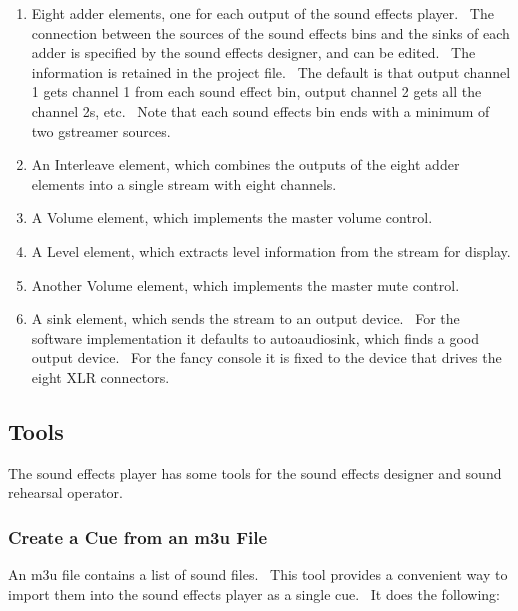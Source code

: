 \documentclass[letterpaper]{article}
\newcommand\liststyleLxix{%
\renewcommand\theenumi{\arabic{enumi}}
\renewcommand\theenumii{\arabic{enumii}}
\renewcommand\theenumiii{\arabic{enumiii}}
\renewcommand\theenumiv{\arabic{enumiv}}
\renewcommand\labelenumi{\theenumi.}
\renewcommand\labelenumii{\theenumii.}
\renewcommand\labelenumiii{\theenumiii.}
\renewcommand\labelenumiv{\theenumiv.}
}
\begin{document}
\liststyleLxix
\begin{enumerate}
\item Eight adder elements, one for each output of the sound effects
player. \ The connection between the sources of the sound effects bins
and the sinks of each adder is specified by the sound effects designer,
and can be edited. \ The information is retained in the project file.
\ The default is that output channel 1 gets channel 1 from each sound
effect bin, output channel 2 gets all the channel 2s, etc. \ Note that
each sound effects bin ends with a minimum of two gstreamer sources.
\item An Interleave element, which combines the outputs of the eight
adder elements into a single stream with eight channels.
\item A Volume element, which implements the master volume control.
\item A Level element, which extracts level information from the stream
for display.
\item Another Volume element, which implements the master mute control.
\item A sink element, which sends the stream to an output device. \ For
the software implementation it defaults to autoaudiosink, which finds a
good output device. \ For the fancy console it is fixed to the device
that drives the eight XLR connectors.
\end{enumerate}
\subsection[Tools]{Tools}
The sound effects player has some tools for the sound effects designer
and sound rehearsal operator.

\subsubsection[Create a Cue from an m3u File]{Create a Cue from an m3u
File}
An m3u file contains a list of sound files. \ This tool provides a
convenient way to import them into the sound effects player as a single
cue. \ It does the following:
\end{document}
